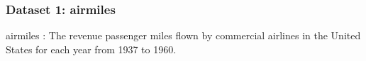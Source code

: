 \subsubsection{Dataset 1: airmiles}
airmiles : The revenue passenger miles flown by commercial airlines in the United States for each year from 1937 to 1960.
